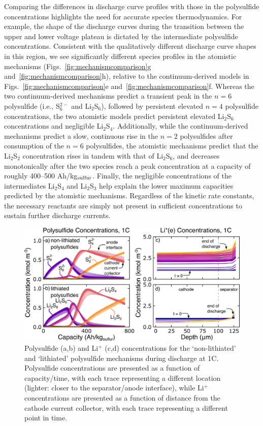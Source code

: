 \documentclass{elsarticle}
\begin{document}
Comparing the differences in discharge curve profiles with those in the polysulfide concentrations highlights the need for accurate species thermodynamics. For example, the shape of the discharge curves during the transition between the upper and lower voltage plateau is dictated by the intermediate polysulfide concentrations. Consistent with the qualitatively different discharge curve shapes in this region, we see significantly different species profiles in the atomistic mechanisms (Figs.~\ref{fig:mechanismcomparison}g and~\ref{fig:mechanismcomparison}h), relative to the continuum-derived models in Figs.~\ref{fig:mechanismcomparison}e and~\ref{fig:mechanismcomparison}f. Whereas the two continuum-derived mechanisms predict a transient peak in the $n=6$ polysulfide (i.e., S$_6^{2-}$ and Li$_2$S$_6$), followed by persistent elevated $n=4$ polysulfide concentrations, the two atomistic models predict persistent elevated Li$_2$S$_6$ concentrations and negligible Li$_2$S$_4$. Additionally, while the continuum-derived mechanisms predict a slow, continuous rise in the $n=2$ polysulfides after consumption of the $n=6$ polysulfides, the atomistic mechanisms predict that the Li$_2$S$_2$ concentration rises in tandem with that of Li$_2$S$_6$, and decreases monotonically after the two species reach a peak concentration at a capacity of roughly 400--500 Ah/kg$_{\rm sulfur}$. Finally, the negligible concentrations of the intermediates Li$_2$S$_4$ and Li$_2$S$_3$ help explain the lower maximum capacities predicted by the atomistic mechanisms.  Regardless of the kinetic rate constants, the necessary reactants are simply not present in sufficient concentrations to sustain further discharge currents.   
\begin{figure}[b!]
    \centering
    \includegraphics[width=\textwidth]{Figures/Figure4_Polysulfide_Comparison.png}
    \caption{Polysulfide (a,b) and Li$^+$ (c,d) concentrations for the `non-lithiated' and `lithiated' polysulfide mechanisms during discharge at 1C. Polysulfide concentrations are presented as a function of capacity/time, with each trace representing a different location (lighter: closer to the separator/anode interface), while Li$^+$ concentrations are presented as a function of distance from the cathode current collector, with each trace representing a different point in time.}
    \label{fig:mechanismcomparisonconc}
\end{figure}
\end{document}
